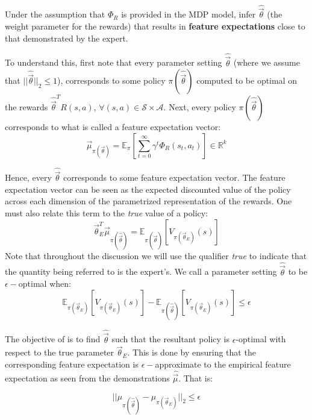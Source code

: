  
 Under the assumption that $\Phi_R$ is provided in the MDP model, \citet{Abbeel:2004:ALV:1015330.1015430} infer $\hat{\vec{\theta}}$ (the weight parameter for the rewards) that results in \textbf{feature expectations} close to that demonstrated by the expert. 

To understand this, first note that every parameter setting $\hat{\vec{\theta}}$ (where we assume that $||\hat{\vec{\theta}}||_2 \leq 1$), corresponds to some policy $\pi(\hat{\vec{\theta}})$ computed to be optimal on the rewards $\hat{\vec{\theta}}^T R(s,a)$, $\forall (s,a) \in \mathcal{S} \times \mathcal{A}$. Next, every policy $\pi(\hat{\vec{\theta}})$ corresponds to what is called a feature expectation vector:
\begin{equation}
\vec{\mu}_{\pi(\vec{\theta})} =\mathbb{E}_{\pi}[\sum_{t=0}^{\infty} \gamma^t \Phi_R(s_t,a_t)] \in \mathbb{R}^k
\end{equation}

Hence, every $\hat{\vec{\theta}}$ corresponds to some feature expectation vector. The feature expectation vector can be seen as the expected discounted value of the policy across each dimension of the parametrized representation of the rewards.  One must also relate this term to the \textit{true}  value of a policy: 
\begin{equation}
 \vec{\theta}_E ^T \vec{\mu}_{\pi(\hat{\vec{\theta}})} = \mathbb{E}_{\pi(\hat{\vec{\theta}})}\left[V_{\pi(\vec{\theta}_E)}(s)\right]
\end{equation}
Note that throughout the discussion we will use the qualifier \textit{true} to indicate that the quantity being referred to is the expert's.  We call a parameter setting $\hat{\vec{\theta}}$  to be $\epsilon-$optimal when:
\begin{equation}
\mathbb{E}_{\pi({\vec{\theta}_E})}\left[V_{\pi(\vec{\theta}_E)}(s)\right]  - \mathbb{E}_{\pi(\hat{\vec{\theta}})}\left[V_{\pi(\vec{\theta}_E)}(s)\right] \leq \epsilon
\end{equation}


The objective of \citet{Abbeel:2004:ALV:1015330.1015430}  is to find $\hat{\vec{\theta}}$ such that the resultant policy is $\epsilon$-optimal with respect to the true parameter $\vec{\theta}_E$. This is done by ensuring that the corresponding feature expectation is $\epsilon-$approximate to the empirical feature expectation as seen from the demonstrations $\hat{\vec{\mu}}$. That is:

\begin{equation}
|| \mu_{\pi(\hat{\vec{\theta}})}  - \mu_{\pi(\vec{\theta}_E)} ||_2 \leq \epsilon
\end{equation}

